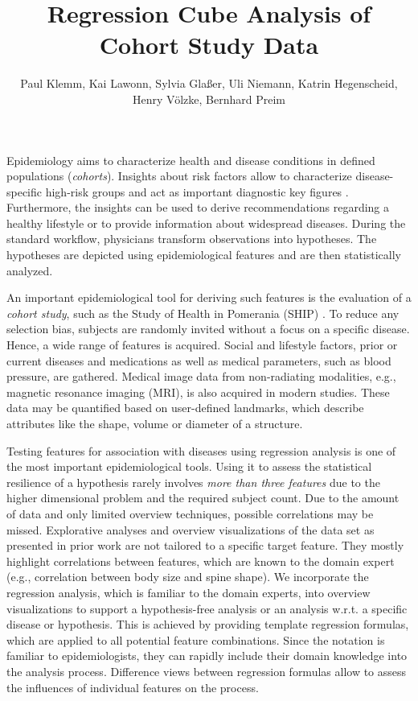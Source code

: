 \documentclass[journal]{style/vgtc} 			          %
\title{Regression Cube Analysis of Cohort Study Data}
\author{Paul Klemm, Kai Lawonn, Sylvia Gla{\ss}er, Uli Niemann, Katrin Hegenscheid, Henry V{\"o}lzke, Bernhard Preim}
\begin{document}


\maketitle
Epidemiology aims to characterize health and disease conditions in defined populations (\emph{cohorts}).
Insights about risk factors allow to characterize disease-specific high-risk groups and act as important diagnostic key figures \cite{Fletcher2012}.
Furthermore, the insights can be used to derive recommendations regarding a healthy lifestyle or to provide information about widespread diseases.
During the standard workflow, physicians transform observations into hypotheses.
The hypotheses are depicted using epidemiological features and are then statistically analyzed.

An important epidemiological tool for deriving such features is the evaluation of a \emph{cohort study}, such as the Study of Health in Pomerania (SHIP) \cite{Volzke2011}.
To reduce any selection bias, subjects are randomly invited without a focus on a specific disease.
Hence, a wide range of features is acquired.
%
Social and lifestyle factors, prior or current diseases and medications as well as medical parameters, such as blood pressure, are gathered.
Medical image data from non-radiating modalities, e.g., magnetic resonance imaging (MRI), is also acquired in modern studies.
These data may be quantified based on user-defined landmarks, which describe attributes like the shape, volume or diameter of a structure.

Testing features for association with diseases using regression analysis is one of the most important epidemiological tools.
Using it to assess the statistical resilience of a hypothesis rarely involves \emph{more than three features} due to the higher dimensional problem and the required subject count.
Due to the amount of data and only limited overview techniques, possible correlations may be missed.
Explorative analyses and overview visualizations of the data set as presented in prior work \cite{Klemm2014VIS} are not tailored to a specific target feature.
They mostly highlight correlations between features, which are known to the domain expert (e.g., correlation between body size and spine shape).
We incorporate the regression analysis, which is familiar to the domain experts, into overview visualizations to support a hypothesis-free analysis or an analysis w.r.t. a specific disease or hypothesis.
This is achieved by providing template regression formulas, which are applied to all potential feature combinations.
Since the notation is familiar to epidemiologists, they can rapidly include their domain knowledge into the analysis process.
Difference views between regression formulas allow to assess the influences of individual features on the process.
\end{document}

